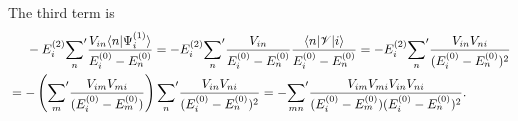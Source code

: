 \documentclass[a4paper]{book}
\newcounter{solution}[chapter]
\begin{document}
\begin{solution}
	The third term is
	\begin{align*}
		&\hspace{1.4em} -E^{(2)}_i { \sum_n }^\prime \frac{ V_{in} \langle n | \Psi^{(1)}_i \rangle }{ E^{(0)}_i - E^{(0)}_n } = -E^{(2)}_i { \sum_n }^\prime \frac{ V_{in} }{ E^{(0)}_i - E^{(0)}_n } \frac{ \langle n | \mathscr{V} | i \rangle }{ E^{(0)}_i - E^{(0)}_n } = -E^{(2)}_i { \sum_n }^\prime \frac{ V_{in} V_{ni} }{ ( E^{(0)}_i - E^{(0)}_n )^2 } \\
		&= - \left( { \sum_m }^\prime \frac{ V_{im} V_{mi} }{ ( E^{(0)}_i - E^{(0)}_m ) } \right) { \sum_n }^\prime \frac{ V_{in} V_{ni} }{ ( E^{(0)}_i - E^{(0)}_n )^2 } = - { \sum_{mn} }^\prime \frac{ V_{im} V_{mi} V_{in} V_{ni} }{ ( E^{(0)}_i - E^{(0)}_m )( E^{(0)}_i - E^{(0)}_n )^2 } .
	\end{align*}		
	

\end{solution}
\end{document}
